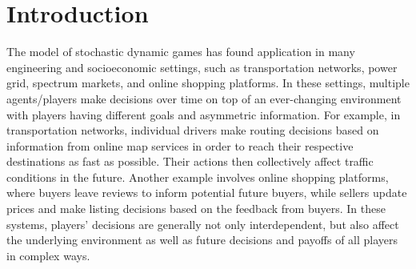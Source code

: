 \documentclass[pdflatex,sn-basic]{sn-jnl}
\theoremstyle{thmstyleone}%
\theoremstyle{thmstyletwo}%
\theoremstyle{thmstylethree}%
\begin{document}





\maketitle
\section{Introduction}\label{sec:suffinfo:intro}
The model of stochastic dynamic games has found application in many engineering and socioeconomic settings, such as transportation networks, power grid, spectrum markets, and online shopping platforms. In these {settings}, multiple agents/players make decisions over time on top of an ever-changing environment with players having different goals and asymmetric information. For example, in transportation networks, individual drivers make routing decisions based on information from online map services in order to reach their respective destinations as fast as possible. Their actions then collectively affect traffic conditions in the future. Another example involves online shopping platforms, where buyers leave reviews to inform potential future buyers, while sellers update prices and make listing decisions based on the feedback from buyers. In these systems, players' decisions are generally not only interdependent, but also affect the underlying environment as well as future decisions and payoffs of all players in complex ways.
\end{document}
